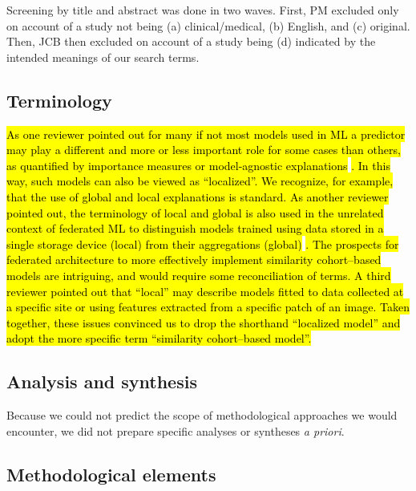 \documentclass[sn-mathphys,Numbered,pdflatex]{sn-jnl}
\theoremstyle{remark}
\theoremstyle{definition}
\begin{document}
Screening by title and abstract was done in two waves. First, PM
excluded only on account of a study not being (a) clinical/medical, (b)
English, and (c) original. Then, JCB then excluded on account of a study
being (d) indicated by the intended meanings of our search terms.

\subsection*{Terminology}\label{terminology}

\hl{As one reviewer pointed out for many if not most models used in ML a predictor may play a different and more or less important role for some cases than others, as quantified by importance measures or model-agnostic explanations }\citep{Biecek2021, Molnar2023}\hl{. In this way, such models can also be viewed as ``localized''. We recognize, for example, that the use of global and local explanations is standard. As another reviewer pointed out, the terminology of local and global is also used in the unrelated context of federated ML to distinguish models trained using data stored in a single storage device (local) from their aggregations (global) }\citep{Moshawrab2023, Brauneck2023}\hl{. The prospects for federated architecture to more effectively implement similarity cohort--based models are intriguing, and would require some reconciliation of terms.
A third reviewer pointed out that ``local'' may describe models fitted to data collected at a specific site or using features extracted from a specific patch of an image. Taken together, these issues convinced us to drop the shorthand ``localized model'' and adopt the more specific term ``similarity cohort--based model''.}

\subsection*{Analysis and synthesis}\label{analysis-and-synthesis}

Because we could not predict the scope of methodological approaches we
would encounter, we did not prepare specific analyses or syntheses
\emph{a priori}.

\subsection*{Methodological elements}\label{methodological-elements}
\end{document}
